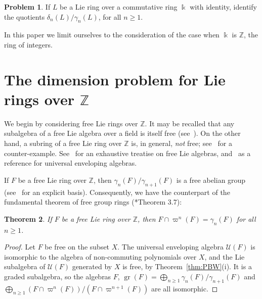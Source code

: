 \documentclass[a4paper,reqno,notitlepage]{amsart}
\newtheorem{theorem}{Theorem}[section]
\theoremstyle{definition}
\newtheorem{problem}[theorem]{Problem}
\newcommand{\Z}{\mathbb Z}
\newcommand\K{\Bbbk}
\newcommand\U{\mathscr U}
\newcommand\gr{\operatorname{gr}}
\begin{document}
\begin{problem}
  If $L$ be a Lie ring over a commutative ring $\K$ with identity,
  identify the quotients $\delta_n(L)/\gamma_n(L)$, for all $n\geq 1$.
\end{problem}

In this paper we limit ourselves to the consideration of the case when
$\K$ is $\Z$, the ring of integers.

\section{The dimension problem for Lie rings over $\Z$}
We begin by considering free Lie rings over $\Z$. It may be recalled
that any subalgebra of a free Lie algebra over a field is itself free
(see~\cites{Shirshov:53,Witt:56}).  On the other hand, a subring of a
free Lie ring over $\Z$ is, in general, \emph{not} free;
see~\cite{Witt:56} for a counter-example. See~\cite{Reutenauer:93} for
an exhaustive treatise on free Lie algebras, and~\cite{Dixmier:77} as
a reference for universal enveloping algebras.

If $F$ be a free Lie ring over $\Z$, then
$\gamma_n(F)/\gamma_{n+1}(F)$ is a free abelian group
(see~\cite{Hall:50} for an explicit basis). Consequently, we have the
counterpart of the fundamental theorem of free group rings
(\cite{Gupta:87}*{Theorem 3.7}):

\begin{theorem}\label{thm:fund}
  If $F$ be a free Lie ring over $\Z$, then $F\cap
  \varpi^n(F)=\gamma_n(F)$ for all $n\geq 1$.
\end{theorem}
\begin{proof}
  Let $F$ be free on the subset $X$. The universal enveloping algebra
  $\U(F)$ is isomorphic to the algebra of non-commuting polynomials
  over $X$, and the Lie subalgebra of $\U(F)$ generated by $X$ is
  free, by Theorem~\ref{thm:PBW}(i). It is a graded subalgebra, so the
  algebras $F$, $\gr(F)=\bigoplus_{n\ge1}\gamma_n(F)/\gamma_{n+1}(F)$
  and $\bigoplus_{n\ge1}(F\cap\varpi^n(F))/(F\cap\varpi^{n+1}(F))$ are
  all isomorphic.
\end{proof}
\end{document}

